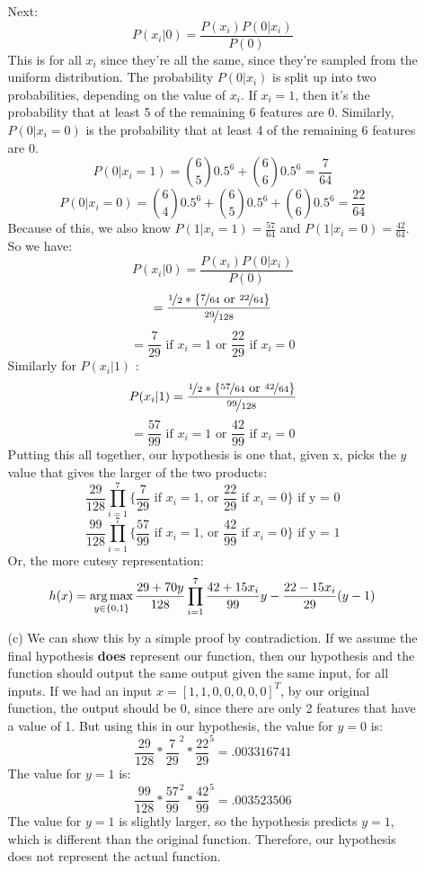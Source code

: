 \begin{enumerate}
\begin{enumerate}
    Next:
    $$P(x_i|0) = \frac{P(x_i)P(0|x_i)}{P(0)}$$
    This is for all $x_i$ since they're all the same, since they're sampled from the uniform distribution. The probability $P(0|x_i)$ is split up into two probabilities, depending on the value of $x_i$. If $x_i=1$, then it's the probability that at least 5 of the remaining 6 features are 0. Similarly, $P(0|x_i=0)$ is the probability that at least 4 of the remaining 6 features are 0.
    $$P(0|x_i=1) = \binom 6 5 0.5^6 + \binom 6 6 0.5^6 = \frac{7}{64}$$
    $$P(0|x_i=0) = \binom 6 4 0.5^6 + \binom 6 5 0.5^6 + \binom 6 6 0.5^6 = \frac{22}{64}$$
    Because of this, we also know $P(1|x_i=1) = \frac{57}{64}$ and $P(1|x_i=0) = \frac{42}{64}$.\\
    So we have:
    $$P(x_i|0)=\frac{P(x_i)P(0|x_i)}{P(0)}$$
    $$=\frac{\nicefrac{1}{2}*\{\nicefrac{7}{64} \text{ or } \nicefrac{22}{64} \}}{\nicefrac{29}{128}}$$
    $$=\frac{7}{29} \text{ if } x_i=1 \text{ or } \frac{22}{29} \text{ if } x_i=0$$
    Similarly for $P(x_i|1)$ :
    $$P(x_i|1) = \frac{\nicefrac{1}{2}*\{\nicefrac{57}{64} \text{ or } \nicefrac{42}{64} \}}{\nicefrac{99}{128}}$$
    $$=\frac{57}{99} \text{ if } x_i=1 \text{ or } \frac{42}{99} \text{ if } x_i=0$$
    Putting this all together, our hypothesis is one that, given x, picks the $y$ value that gives the larger of the two products:
    $$\frac{29}{128} \prod_{i=1}^7 \{ \frac{7}{29} \text{ if } x_i=1 \text{, or } \frac{22}{29} \text{ if } x_i=0 \} \text{ if y = 0}$$
    $$\frac{99}{128} \prod_{i=1}^7 \{ \frac{57}{99} \text{ if } x_i=1 \text{, or } \frac{42}{99} \text{ if } x_i=0 \} \text{ if y = 1}$$
    Or, the more cutesy representation:
    $$h(x) = \operatorname*{arg\,max}_{y \in \{0,1\}} \frac{29+70y}{128} \prod_{i=1}^7 \frac{42+15x_i}{99}y - \frac{22-15x_i}{29}(y-1)$$
  \item[(c)]
    We can show this by a simple proof by contradiction. If we assume the final hypothesis \textbf{does} represent our function, then our hypothesis and the function should output the same output given the same input, for all inputs. If we had an input $x=[1,1,0,0,0,0,0]^T$, by our original function, the output should be 0, since there are only 2 features that have a value of 1. But using this in our hypothesis, the value for $y=0$ is:
    $$\frac{29}{128} * \frac{7}{29}^2 * \frac{22}{29}^5 = .003316741$$
    The value for $y=1$ is:
    $$\frac{99}{128} * \frac{57}{99}^2 * \frac{42}{99}^5 = .003523506$$
    The value for $y=1$ is slightly larger, so the hypothesis predicts $y=1$, which is different than the original function. Therefore, our hypothesis does not represent the actual function.

\end{enumerate}
\end{enumerate}
